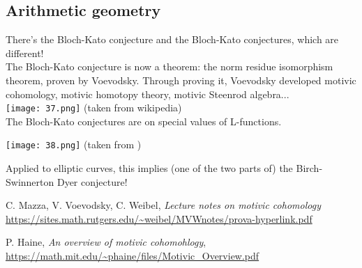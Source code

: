 \documentclass[a4paper, 11pt]{article} %
\theoremstyle{remark}
\newcommand{\?}{{\color{red} ???}}
\begin{document}
\subsection{Arithmetic geometry} 
There's the Bloch-Kato conjecture and the Bloch-Kato conjectures, which are different! \\ 

The Bloch-Kato conjecture is now a theorem: the norm residue isomorphism theorem, proven by Voevodsky.  Through proving it, Voevodsky developed motivic cohomology, motivic homotopy theory, motivic Steenrod algebra... \\

\texttt{[image: 37.png]} 
(taken from wikipedia) \\ 

The Bloch-Kato conjectures are on special values of L-functions.  

\texttt{[image: 38.png]} 
(taken from \cite{Haine})

Applied to elliptic curves, this implies (one of the two parts of) the Birch-Swinnerton Dyer conjecture!

\begin{thebibliography}{9}
C. Mazza, V. Voevodsky, C. Weibel, \textit{Lecture notes on motivic cohomology}
\url{https://sites.math.rutgers.edu/~weibel/MVWnotes/prova-hyperlink.pdf}

P. Haine, \textit{An overview of motivic cohomohlogy}, \url{https://math.mit.edu/~phaine/files/Motivic_Overview.pdf}
\end{thebibliography}
\end{document}
